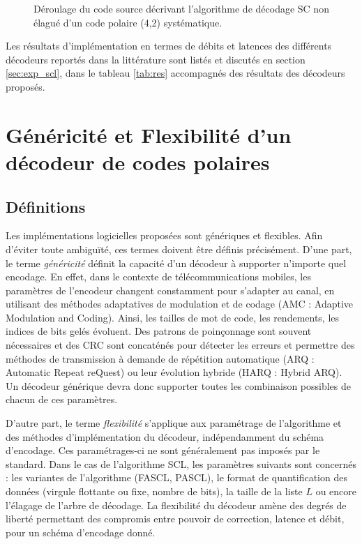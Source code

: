 \begin{figure}[t]
{\begin{minipage}{.35\linewidth}
  \label{fig:unrolled_tree}
  \end{minipage}%
  }
  \caption{Déroulage du code source décrivant l'algorithme de décodage SC non élagué d'un code polaire (4,2) systématique.}
  \label{fig:unrolling}
\end{figure}

Les résultats d'implémentation en termes de débits et latences des différents décodeurs reportés dans la littérature \cite{sarkis_increasing_2014,sarkis_fast_2016,shen_low-latency_2016} sont listés et discutés en section \ref{sec:exp_scl}, dans le tableau \ref{tab:res} accompagnés des résultats des décodeurs proposés.

\section{Généricité et Flexibilité d'un décodeur de codes polaires}

\label{sec:gen_scl}
\subsection{Définitions}
Les implémentations logicielles proposées sont génériques et flexibles. Afin d'éviter toute ambiguïté, ces termes doivent être définis précisément.
D'une part, le terme \textit{généricité} définit la capacité d'un décodeur à supporter n'importe quel encodage.
En effet, dans le contexte de télécommunications mobiles, les paramètres de l'encodeur changent constamment pour s'adapter au canal, en utilisant des méthodes adaptatives de modulation et de codage \cite{dahlman_4g:_2013} (AMC : Adaptive Modulation and Coding). Ainsi, les tailles de mot de code, les rendements, les indices de bits gelés évoluent. Des patrons de poinçonnage sont souvent nécessaires et des CRC sont concaténés pour détecter les erreurs et permettre des méthodes de transmission à demande de répétition automatique (ARQ : Automatic Repeat reQuest) ou leur évolution hybride (HARQ : Hybrid ARQ). Un décodeur générique devra donc supporter toutes les combinaison possibles de chacun de ces paramètres.

D'autre part, le terme \textit{flexibilité} s'applique aux paramétrage de l'algorithme et des méthodes d'implémentation du décodeur, indépendamment du schéma d'encodage. Ces paramétrages-ci ne sont généralement pas imposés par le standard. Dans le cas de l'algorithme SCL, les paramètres suivants sont concernés : les variantes de l'algorithme (FASCL, PASCL), le format de quantification des données (virgule flottante ou fixe, nombre de bits), la taille de la liste $L$ ou encore l'élagage de l'arbre de décodage. La flexibilité du décodeur amène des degrés de liberté permettant des compromis entre pouvoir de correction, latence et débit, pour un schéma d'encodage donné.

